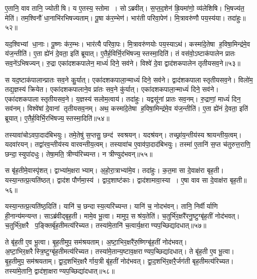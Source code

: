 ए॒तानि॒ वाव तानि॒ ज्योतीषि।
य ए॒तस्य॒ स्तोमा।
सोऽब्रवीत्।
स॒प्त॒द॒शेन॑ ह्रि॒यमा॑णो॒ व्य॑लेशिषि।
भि॒षज्य॑त॒ मेति॑।
तम॒श्विनौ॑ धा॒नाभि॑रभिषज्यताम्।
पू॒षा क॑र॒म्भेण॑।
भार॑ती परिवा॒पेण॑।
मि॒त्रावरु॑णौ पय॒स्य॑या।
तदा॑हुः॥५२॥

यद॒श्विभ्यां धा॒नाः।
पू॒ष्णः क॑र॒म्भः।
भार॑त्यै परिवा॒पः।
मि॒त्रावरु॑णयोः पय॒स्याऽथ॑।
कस्मा॑दे॒तेषा ह॒विषा॒मिन्द्र॑मे॒व य॑ज॒न्तीति॑।
ए॒ता ह्ये॑नं दे॒वता॒ इति॑ ब्रूयात्।
ए॒तैर्\mbox{}ह॒विर्भि॒\-रभि॑षज्य॒स्तस्मा॒दिति॑।
तं वस॑वो॒ऽष्टाक॑पालेन प्रातः सव॒ने॑ऽभिषज्यन्।
रु॒द्रा एका॑दशकपालेन॒ माध्यं॑ दिने॒ सव॑ने।
विश्वे॑ दे॒वा द्वाद॑शकपालेन तृतीयसव॒ने॥५३॥

स यद॒ष्टाक॑पालान्प्रातः सव॒ने कु॒र्यात्।
एका॑दशकपाला॒न्माध्यं॑ दिने॒ सव॑ने।
द्वाद॑शकपालास्तृतीयसव॒ने।
विलो॑म॒ तद्य॒ज्ञस्य॑ क्रियेत।
एका॑दशकपालाने॒व प्रा॑तः सव॒ने कु॑र्यात्।
एका॑दशकपाला॒न्माध्यं॑ दिने॒ सव॑ने।
एका॑दशकपाला\-स्तृतीयसव॒ने।
य॒ज्ञस्य॑ सलोम॒त्वाय॑।
तदा॑हुः।
यद्वसू॑नां प्रातः सव॒नम्।
रु॒द्राणां॒ माध्यं॑ दिन॒ सव॑नम्।
विश्वे॑षां दे॒वानां तृतीयसव॒नम्।
अथ॒ कस्मा॑दे॒तेषा ह॒विषा॒मिन्द्र॑मे॒व य॑ज॒न्तीति॑।
ए॒ता ह्ये॑नं दे॒वता॒ इति॑ ब्रूयात्।
ए॒तैर्\-\mbox{}ह॒विर्भि॒रभि॑\-षज्य॒स्तस्मा॒दिति॑॥५४॥\anuvakamend[ए॒क॒वि॒श आ॑हुस्तृतीयसव॒ने प्रा॑तः सव॒नं पञ्च॑ च]

तस्यावा॑चोऽवपा॒दाद॑बिभयुः।
तमे॒तेषु॑ स॒प्तसु॒ छन्द॑ स्वश्रयन्।
यदश्र॑यन्।
तच्छ्रा॑य॒न्तीय॑स्य श्रायन्तीय॒त्वम्।
यदवा॑रयन्।
तद्वा॑रव॒न्तीय॑स्य वारवन्तीय॒त्वम्।
तस्यावा॑च ए॒वाव॑पा॒दाद॑बिभयुः।
तस्मा॑ ए॒तानि॑ स॒प्त च॑तुरुत्त॒राणि॒ छन्दा॒स्युपा॑दधुः।
तेषा॒मति॒ त्रीण्य॑रिच्यन्त।
न त्रीण्युद॑भवन्॥५५॥

स बृ॑ह॒तीमे॒वास्पृ॑शत्।
द्वाभ्या॑म॒क्षराभ्याम्।
अ॒हो॒रा॒त्राभ्या॑मे॒व।
तदा॑हुः।
क॒त॒मा सा दे॒वाक्ष॑रा बृह॒ती।
यस्या॒न्तत्प्र॒त्यति॑ष्ठत्।
द्वाद॑श पौर्णमा॒स्य॑।
द्वाद॒शाष्ट॑काः।
द्वाद॑शामावा॒स्या।
ए॒षा वाव सा दे॒वाक्ष॑रा बृह॒ती॥५६॥

यस्या॒न्तत्प्र॒त्यति॑ष्ठ॒दिति॑।
यानि॑ च॒ छन्दास्य॒त्यरि॑च्यन्त।
यानि॑ च॒ नोदभ॑वन्।
तानि॒ निर्वीर्याणि ही॒नान्य॑मन्यन्त।
साऽब्र॑वीद्बृह॒ती।
मामे॒व भू॒त्वा।
मामुप॒ सश्र॑य॒तेति॑।
च॒तुर्भि॑र॒क्षरै॑रनु॒ष्टुग्बृ॑ह॒तीं नोद॑भवत्।
च॒तुर्भि॑र॒क्षरै प॒ङ्क्तिर्बृ॑ह॒ती\-मत्य॑रिच्यत।
तस्या॑मे॒तानि॑ च॒त्वार्य॒क्षराण्यप॒च्छिद्या॑\-दधात्॥५७॥

ते बृ॑ह॒ती ए॒व भू॒त्वा।
बृ॒ह॒तीमुप॒ सम॑श्रयताम्।
अ॒ष्टा॒भि\-र॒क्षरै॑रु॒ष्णिग्बृ॑ह॒तीं नोद॑भवत्।
अ॒ष्टा॒भि\-र॒क्षरैस्त्रि॒ष्टुग्बृ॑ह॒ती\-मत्य॑\-रिच्यत।
तस्या॑मे॒तान्य॒ष्टाव॒क्षराण्यप॒च्छिद्या॑\-दधात्।
ते बृ॑ह॒ती ए॒व भू॒त्वा।
बृ॒ह॒तीमुप॒ सम॑श्रयताम्।
द्वा॒द॒शभि॑र॒क्षरैर्गाय॒त्री बृ॑ह॒तीं नोद॑भवत्।
द्वा॒द॒शभि॑र॒क्षरै॒र्जग॑ती बृह॒तीमत्य॑रिच्यत।
तस्या॑मे॒तानि॒ द्वाद॑शा॒क्षराण्यप॒च्छिद्या॑\-दधात्॥५८॥

